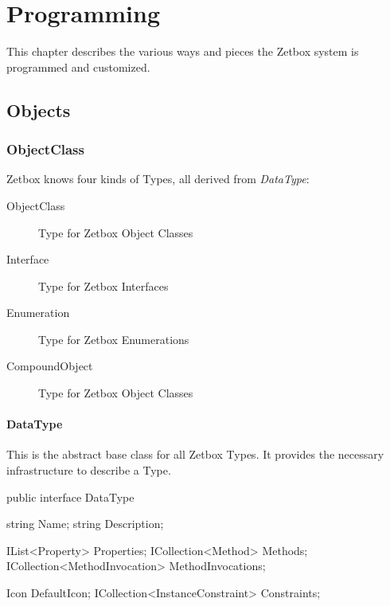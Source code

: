 \chapter{Programming}

This chapter describes the various ways and pieces the Zetbox system is
programmed and customized.

\section{Objects}

\subsection{ObjectClass}

Zetbox knows four kinds of Types, all derived from \emph{DataType}:
\begin{description}
\item[ObjectClass] { Type for Zetbox Object Classes }
\item[Interface] { Type for Zetbox Interfaces }
\item[Enumeration] { Type for Zetbox Enumerations }
\item[CompoundObject] { Type for Zetbox Object Classes }
\end{description}

\subsubsection{DataType}
This is the abstract base class for all Zetbox Types. It provides the necessary
infrastructure to describe a Type.

\begin{CS}
public interface DataType 
{
    string Name;
    string Description;

    IList<Property> Properties;
    ICollection<Method> Methods;
    ICollection<MethodInvocation> MethodInvocations;

    Icon DefaultIcon;
    ICollection<InstanceConstraint> Constraints;
}
\end{CS}

